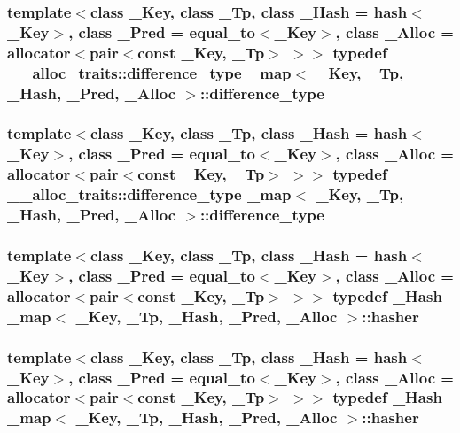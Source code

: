 \subsubsection[{difference\+\_\+type}]{\setlength{\rightskip}{0pt plus 5cm}template$<$class \+\_\+\+Key, class \+\_\+\+Tp, class \+\_\+\+Hash = hash$<$\+\_\+\+Key$>$, class \+\_\+\+Pred = equal\+\_\+to$<$\+\_\+\+Key$>$, class \+\_\+\+Alloc = allocator$<$pair$<$const \+\_\+\+Key, \+\_\+\+Tp$>$ $>$$>$ typedef \+\_\+\+\_\+alloc\+\_\+traits\+::difference\+\_\+type {\bf \+\_\+map}$<$ \+\_\+\+Key, \+\_\+\+Tp, \+\_\+\+Hash, \+\_\+\+Pred, \+\_\+\+Alloc $>$\+::{\bf difference\+\_\+type}}\label{class__map_aacdde0553a8fa29ac5cb1678bdf04098}
\hypertarget{class__map_aacdde0553a8fa29ac5cb1678bdf04098}{}
\subsubsection[{difference\+\_\+type}]{\setlength{\rightskip}{0pt plus 5cm}template$<$class \+\_\+\+Key, class \+\_\+\+Tp, class \+\_\+\+Hash = hash$<$\+\_\+\+Key$>$, class \+\_\+\+Pred = equal\+\_\+to$<$\+\_\+\+Key$>$, class \+\_\+\+Alloc = allocator$<$pair$<$const \+\_\+\+Key, \+\_\+\+Tp$>$ $>$$>$ typedef \+\_\+\+\_\+alloc\+\_\+traits\+::difference\+\_\+type {\bf \+\_\+map}$<$ \+\_\+\+Key, \+\_\+\+Tp, \+\_\+\+Hash, \+\_\+\+Pred, \+\_\+\+Alloc $>$\+::{\bf difference\+\_\+type}}\label{class__map_aacdde0553a8fa29ac5cb1678bdf04098}
\hypertarget{class__map_a1ca536646126d87b3ac0b7fe3aee3534}{}
\subsubsection[{hasher}]{\setlength{\rightskip}{0pt plus 5cm}template$<$class \+\_\+\+Key, class \+\_\+\+Tp, class \+\_\+\+Hash = hash$<$\+\_\+\+Key$>$, class \+\_\+\+Pred = equal\+\_\+to$<$\+\_\+\+Key$>$, class \+\_\+\+Alloc = allocator$<$pair$<$const \+\_\+\+Key, \+\_\+\+Tp$>$ $>$$>$ typedef \+\_\+\+Hash {\bf \+\_\+map}$<$ \+\_\+\+Key, \+\_\+\+Tp, \+\_\+\+Hash, \+\_\+\+Pred, \+\_\+\+Alloc $>$\+::{\bf hasher}}\label{class__map_a1ca536646126d87b3ac0b7fe3aee3534}
\hypertarget{class__map_a1ca536646126d87b3ac0b7fe3aee3534}{}
\subsubsection[{hasher}]{\setlength{\rightskip}{0pt plus 5cm}template$<$class \+\_\+\+Key, class \+\_\+\+Tp, class \+\_\+\+Hash = hash$<$\+\_\+\+Key$>$, class \+\_\+\+Pred = equal\+\_\+to$<$\+\_\+\+Key$>$, class \+\_\+\+Alloc = allocator$<$pair$<$const \+\_\+\+Key, \+\_\+\+Tp$>$ $>$$>$ typedef \+\_\+\+Hash {\bf \+\_\+map}$<$ \+\_\+\+Key, \+\_\+\+Tp, \+\_\+\+Hash, \+\_\+\+Pred, \+\_\+\+Alloc $>$\+::{\bf hasher}}\label{class__map_a1ca536646126d87b3ac0b7fe3aee3534}
\hypertarget{class__map_a9ed817d33532f34fc46649b3fbe8e612}{}
